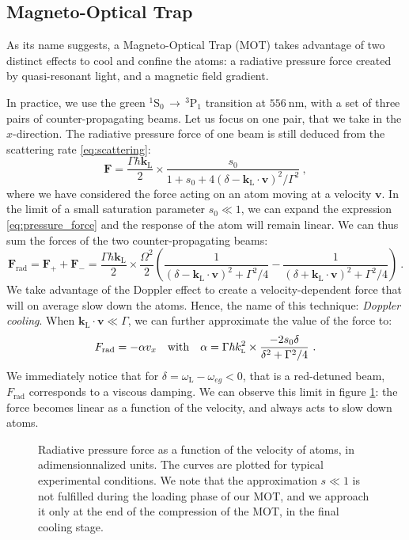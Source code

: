 \documentclass[11pt]{article}
\newcommand{\mathsc}[1]{\mathrm{\scriptscriptstyle {#1}}}
\numberwithin{equation}{section}
\numberwithin{figure}{section}
\begin{document}
\subsection{Magneto-Optical Trap}
\label{sec:MOT_theory}

As its name suggests, a Magneto-Optical Trap (MOT) takes advantage of two distinct effects to cool and confine the atoms: a radiative pressure force created by quasi-resonant light, and a magnetic field gradient. 

In practice, we use the green $^1$S$_0 \, \rightarrow \, ^3$P$_1$ transition at $\SI{556}{\nano\metre}$, with a set of three pairs of counter-propagating beams. Let us focus on one pair, that we take in the $x$-direction. The radiative pressure force of one beam is still deduced from the scattering rate \eqref{eq:scattering}:
%
\begin{equation}
	\label{eq:pressure_force}
	\mathbf{F} = \frac{\Gamma \hbar \mathbf{k}_\mathsc{L}}{2} \times \frac{s_0}{1 + s_0 + 4 (\delta  - \mathbf{k}_\mathsc{L} \cdot \mathbf{v})^2 /\Gamma ^2} ~,
\end{equation}
%
where we have considered the force acting on an atom moving at a velocity $\mathbf{v}$. In the limit of a small saturation parameter $s_0 \ll 1$, we can expand the expression \eqref{eq:pressure_force} and the response of the atom will remain linear. We can thus sum the forces of the two counter-propagating beams:
%
\begin{equation}
	\label{eq:force_rad}
 \mathbf{F}_\text{rad} = \mathbf{F}_+ + \mathbf{F}_- =  \frac{\Gamma \hbar \mathbf{k}_\mathsc{L}}{2} \times \frac{\Omega^2}{2} \left( \frac{1}{(\delta  - \mathbf{k}_\mathsc{L} \cdot \mathbf{v})^2 + \Gamma^2/4}  - \frac{1}{(\delta  + \mathbf{k}_\mathsc{L} \cdot \mathbf{v})^2 + \Gamma^2/4}  \right)~.
\end{equation}
% 
We take advantage of the Doppler effect to create a velocity-dependent force that will on average slow down the atoms. Hence, the name of this technique: \emph{Doppler cooling}. When $\mathbf{k}_\mathsc{L} \cdot \mathbf{v} \ll \Gamma$, we can further approximate the value of the force to:
%
\begin{equation}
	 F_\text{rad} = - \alpha v_x \qq{with} \alpha = \Gamma \hbar k_\mathsc{L}^2 \times \frac{-2 s_0 \delta}{\delta^2 + \Gamma^2 / 4}~.
\end{equation}
%
We immediately notice that for $\delta =  \omega_\mathsc{L} - \omega_{eg} < 0$, that is a red-detuned beam, $F_\text{rad}$ corresponds to a viscous damping. We can observe this limit in figure \ref{fig:force_MOT}: the force becomes linear as a function of the velocity, and always acts to slow down atoms.
%
\begin{figure}[htbp]
	\centering
    
	\caption{\small Radiative pressure force as a function of the velocity of atoms, in adimensionnalized units. The curves are plotted for typical experimental conditions. We note that the approximation $s \ll 1$ is not fulfilled during the loading phase of our MOT, and we approach it only at the end of the compression of the MOT, in the final cooling stage.}
    \label{fig:force_MOT}
\end{figure}
%
\end{document}
